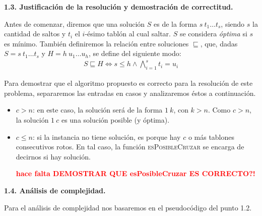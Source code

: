\vspace*{0.75cm} \noindent



\noindent
\textbf{1.3. Justificación de la resolución y demostración de correctitud.}

\vspace*{0.3cm}

Antes de comenzar, diremos que una solución $S$ es de la forma $s \ t_1 \dots t_s$,
siendo $s$ la cantidad de saltos y $t_i$ el $i$-ésimo tablón al cual saltar. $S$ se considera
\textit{óptima} si $s$ es mínimo. También definiremos la relación entre soluciones $\sqsubseteq$, que,
dadas $S = s \ t_1 \dots t_s$ y $H = h \ u_1 \dots u_h$, se define del siguiente modo:
\begin{align*}
  S \sqsubseteq H \iff s \leq h \wedge \bigwedge_{i=1}^s t_i = u_i
\end{align*}

Para demostrar que el algoritmo propuesto es correcto para la resolución de este problema, 
separaremos las entradas en casos y analizaremos éstos a continuación.

\begin{itemize}
  \item $c > n$: en este caso, la solución será de la forma $1 \ k$, con $k > n$. Como $c > n$, la 
  solución $1 \ c$ es una solución posible (y óptima).
  
  \item $c \leq n$: si la instancia no tiene solución, es porque hay $c$ o más tablones consecutivos rotos.
  En tal caso, la función \textsc{esPosibleCruzar} se encarga de decirnos si hay solución.
  
  \textcolor{red}{\textbf{hace falta DEMOSTRAR QUE esPosibleCruzar ES CORRECTO?!}}

\end{itemize}


\vspace*{0.75cm} \noindent



\noindent
\textbf{1.4. Análisis de complejidad.}

\vspace*{0.3cm}

Para el análisis de complejidad nos basaremos en el pseudocódigo del punto 1.2.

